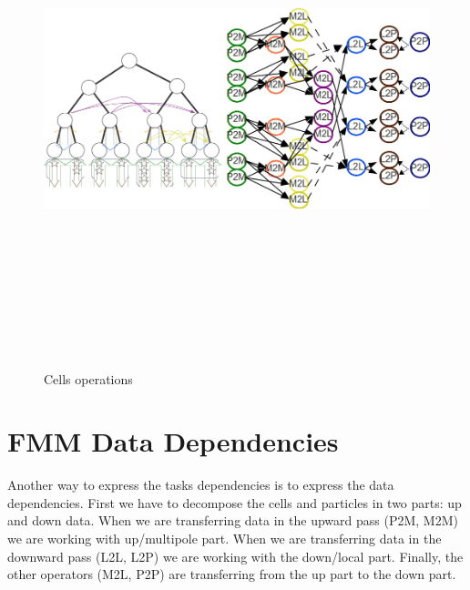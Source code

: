 \documentclass[12pt,letterpaper,titlepage]{report}
\begin{document}
\begin{figure}[h!]
\begin{center}
\includegraphics[width=15cm, height=15cm, keepaspectratio=true]{dag.jpg}
\caption{Cells operations}
\end{center}
\end{figure}
\section{FMM Data Dependencies}
Another way to express the tasks dependencies is to express the data dependencies.
First we have to decompose the cells and particles in two parts: up and down data.
When we are transferring data in the upward pass (P2M, M2M) we are working with up/multipole part.
When we are transferring data in the downward pass (L2L, L2P) we are working with the down/local part.
Finally, the other operators (M2L, P2P) are transferring from the up part to the down part.

\end{document}
